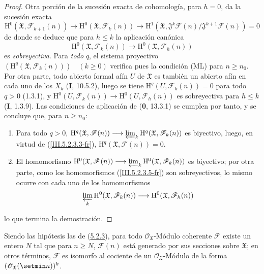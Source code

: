 \begin{proof}
Otra porción de la sucesión exacta de cohomología, para $h=0$, da la sucesión
exacta
\begin{equation}
\mathrm H^0(\mathfrak X,\mathcal F_{k+1}(n))\to
\mathrm H^0(\mathfrak X,\mathcal F_k(n))\to
\mathrm H^1(\mathfrak X,
\mathfrak J^k\mathcal F(n)/\mathfrak J^{k+1}\mathcal F(n))=0
\tag{5.2.3.4}
\label{III.5.2.3.4-fr}
\end{equation}
de donde se deduce que para $h\leq k$ la aplicación canónica
\begin{equation}
\mathrm H^0(\mathfrak X,\mathcal F_k(n))\longrightarrow
\mathrm H^0(\mathfrak X,\mathcal F_h(n))
\tag{5.2.3.5}
\label{III.5.2.3.5-fr}
\end{equation}
es \emph{sobreyectiva}. Para \emph{todo} $q$, el sistema proyectivo
$(\mathrm H^q(\mathfrak X,\mathcal F_k(n)))\quad(k\geq0)$ verifica pues la condición
(ML) para $n\geq n_0$. Por otra parte, todo abierto formal afín $U$ de $\mathfrak X$
es también un abierto afín en cada uno de los $X_k$ (\textbf{I}, 10.5.2), luego se tiene
$\mathrm H^q(U,\mathcal F_k(n))=0$ para todo $q>0$ (1.3.1), y
$\mathrm H^0(U,\mathcal F_k(n))\to\mathrm H^0(U,\mathcal F_h(n))$ es sobreyectiva
para $h\leq k$ (\textbf{I}, 1.3.9). Las condiciones de aplicación de (\textbf{0}, 13.3.1) se
cumplen por tanto, y se concluye que, para $n\geq n_0$:
\begin{enumerate}
\item[$1^\circ$] Para todo $q>0$,
$\mathrm H^q(\mathfrak X,\mathcal F(n))\longrightarrow
\varprojlim_k\mathrm H^q(\mathfrak X,\mathcal F_k(n))$
es biyectivo, luego, en virtud de (\ref{III.5.2.3.3-fr}),
$\mathrm H^q(\mathfrak X,\mathcal F(n))=0$.
\item[$2^\circ$] El homomorfismo
$\mathrm H^0(\mathfrak X,\mathcal F(n))\longrightarrow
\varprojlim_k\mathrm H^0(\mathfrak X,\mathcal F_k(n))$
es biyectivo; por otra parte, como los homomorfismos
(\ref{III.5.2.3.5-fr}) son sobreyectivos, lo mismo ocurre con cada uno de los
homomorfismos
\[
\varprojlim_k\mathrm H^0(\mathfrak X,\mathcal F_k(n))
\longrightarrow\mathrm H^0(\mathfrak X,\mathcal F_h(n))
\]
\end{enumerate}
lo que termina la demostración.
\end{proof}

\begin{corollary}[5.2.4]
\label{III.5.2.4-fr}
Siendo las hipótesis las de \textup{(\hyperref[III.5.2.3-fr]{5.2.3})}, para todo
$\mathcal O_{\mathfrak X}$-Módulo coherente $\mathcal F$ existe un entero $N$
tal que para $n\geq N$, $\mathcal F(n)$ está generado por sus secciones sobre
$\mathfrak X$; en otros términos, $\mathcal F$ es isomorfo al cociente de un
$\mathcal O_{\mathfrak X}$-Módulo de la forma
$(\mathcal O_{\mathfrak X}(\setmin n))^k$.
\end{corollary}

